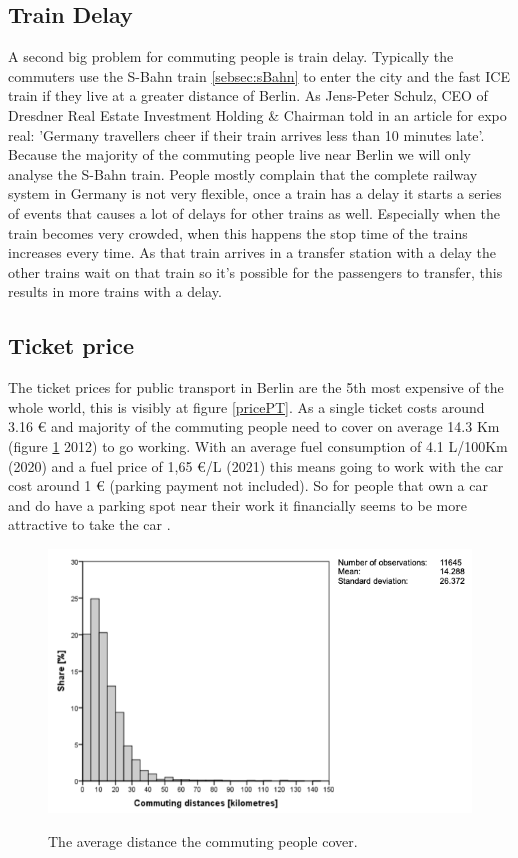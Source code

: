 \subsection{Train Delay}
A second big problem for commuting people is train delay. Typically the commuters use  the S-Bahn train \ref{sebsec:sBahn} to enter the city and the fast ICE train if they live at a greater distance of Berlin. As Jens-Peter Schulz, CEO of Dresdner Real Estate Investment Holding \& Chairman told in an article for expo real: 'Germany travellers cheer if their train arrives less than 10 minutes late'. Because the majority of the commuting people live near Berlin we will only analyse the S-Bahn train. People mostly complain that the complete railway system in Germany is not very flexible, once a train has a delay it starts a series of events that causes a lot of delays for other trains as well. Especially when the train becomes very crowded, when this happens the stop time of the trains increases every time. As that train arrives in a transfer station with a delay the other trains wait on that train so it's possible for the passengers to transfer, this results in more trains with a delay. 

\subsection{Ticket price}
The ticket prices for public transport in Berlin are the 5th most expensive of the whole world, this is visibly at figure \ref{pricePT}. As a single ticket costs around 3.16 € and majority of the commuting people need to cover on average 14.3 Km (figure \ref{averageComDis} 2012) to go working. With an average fuel consumption of 4.1 L/100Km (2020) and a fuel price of  1,65 €/L (2021) this means going to work with the car cost around 1 € (parking payment not included). So for people that own a car and do have a parking spot near their work it financially seems to be more attractive to take the car . 

\begin{figure}[h!]
	\centering
	\includegraphics[width=0.55\textheight]{ProblemsFigures/averageCommutingDistance}
	\label{averageComDis}
	\caption{The average distance the commuting people cover. }
\end{figure}

